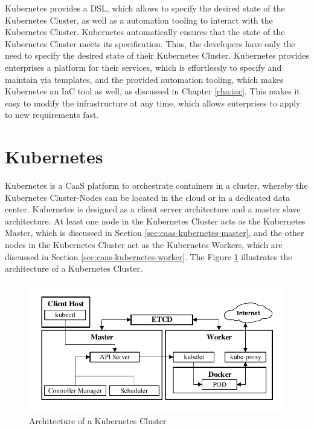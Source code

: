 Kubernetes provides a DSL, which allows to specify the desired state of the Kubernetes Cluster, as well as a automation tooling to interact with the Kubernetes Cluster. Kubernetes automatically ensures that the state of the Kubernetes Cluster meets its specification. Thus, the developers have only the need to specify the desired state of their Kubernetes Cluster. Kubernetes provides enterprises a platform for their services, which is effortlessly to specify and maintain via templates, and the provided automation tooling, which makes Kubernetes an IaC tool as well, as discussed in Chapter \vref{cha:iac}. This makes it easy to modify the infrastructure at any time, which allows enterprises to apply to new requirements fast.

\section{Kubernetes}
\label{sec:caas-kubernetes}
Kubernetes is a CaaS platform to orchestrate containers in a cluster, whereby the Kubernetes Cluster-Nodes can be located in the cloud or in a dedicated data center. Kubernetes is designed as a client server architecture and a master slave architecture. At least one node in the Kubernetes Cluster acts as the Kubernetes Master, which is discussed in Section \vref{sec:caas-kubernetes-master}, and the other nodes in the Kubernetes Cluster act as the Kubernetes Workers, which are discussed in Section \vref{sec:caas-kubernetes-worker}. The Figure \ref{fig:kubernetes-cluster-architecture} illustrates the architecture of a Kubernetes Cluster.

\begin{figure}[htbp]
	\centering
	\includegraphics[scale=1]{images/kubernetes-cluster-architecture.pdf}
	\caption{Architecture of a Kubernetes Cluster}
	\label{fig:kubernetes-cluster-architecture}
\end{figure} 

